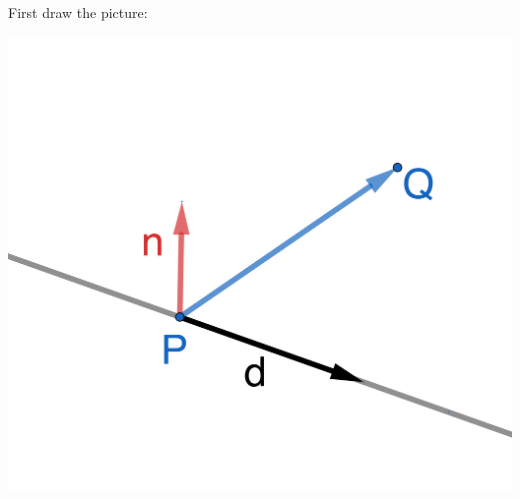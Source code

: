 \documentclass{article}
\begin{document}
\begin{Answer}
  First draw the picture:\

  \includegraphics[scale=1.5]{plane-from-line-and-point.png}\\


\end{Answer}
\end{document}
